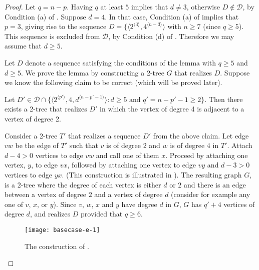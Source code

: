 \documentclass[lotsofwhite,charterfonts]{patmorin}
\newcommand{\rep}[1]{^{\langle#1\rangle}}
\begin{document}
\begin{proof}
Let $q=n-p$. Having $q$ at least $5$ implies that $d\not=3$, otherwise
$D\not\in \mathcal{D}$, by Condition (a) of . Suppose
$d=4$. In that case, Condition (a) of  implies that
$p=3$, giving rise to the sequence $D=\{\langle
2\rep{3},4\rep{n-3}\rangle$ with $n\geq 7$ (since $q\geq 5$). This
sequence is excluded from $\mathcal{D}$, by Condition (d) of
. Therefore we may assume that $d\geq 5$.

Let $D$ denote a sequence satisfying the conditions of the lemma with
$q\geq 5$ and $d\geq 5$.  We prove the lemma by constructing a 2-tree
$G$ that realizes $D$.  Suppose we know the following claim to be
correct (which will be proved later).

\begin{clm} 
Let $D'\in \mathcal{D}\cap \{\langle 2\rep{p'},4,
d\rep{n-p'-1}\rangle:\mbox{$d\ge 5$ and $q'=n-p'-1 \ge 2$}\}$.  Then
there exists a 2-tree that realizes $D'$ in which the vertex of degree
4 is adjacent to a vertex of degree 2.  
\end{clm}

Consider a 2-tree $T'$ that realizes a sequence $D'$ from the above
claim. Let edge $vw$ be the edge of $T'$ such that $v$ is of degree 2
and $w$ is of degree 4 in $T'$. Attach $d-4>0$ vertices to edge $vw$
and call one of them $x$. Proceed by attaching one vertex, $y$, to
edge $vx$, followed by attaching one vertex to edge $vy$ and $d-3>0$
vertices to edge $yx$. (This construction is illustrated in
). The resulting graph $G$, is a 2-tree where the
degree of each vertex is either $d$ or $2$ and there is an edge
between a vertex of degree $2$ and a vertex of degree $d$ (consider
for example any one of $v$, $x$, or $y$). Since $v$, $w$, $x$ and $y$
have degree $d$ in $G$, $G$ has $q'+4$ vertices of degree $d$, and
realizes $D$ provided that $q\geq 6$.  

\begin{figure} \begin{center}
\texttt{[image: basecase-e-1]} \end{center} \caption{The
construction of .} 
\end{figure}


\end{proof}
\end{document}
